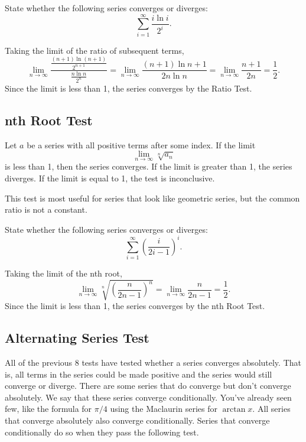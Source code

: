 \begin{example}
	State whether the following series converges or diverges:
	\begin{equation*}
		\sum_{i=1}^{\infty}{\frac{i\ln{i}}{2^i}}.
	\end{equation*}
\end{example}
Taking the limit of the ratio of subsequent terms,
\begin{equation*}
	\lim_{n\to\infty}{\frac{\frac{(n+1)\ln{(n+1)}}{2^{n+1}}}{\frac{n\ln{n}}{2^n}}} = \lim_{n\to\infty}{\frac{(n+1)\ln{n+1}}{2n\ln{n}}} = \lim_{n\to\infty}{\frac{n+1}{2n}} = \frac{1}{2}.
\end{equation*}
\indent
Since the limit is less than 1, the series converges by the Ratio Test.

\subsection{nth Root Test}
\begin{lemma}
	Let $a$ be a series with all positive terms after some index.
	If the limit
	\begin{equation*}
		\lim_{n\to\infty}{\sqrt[n]{a_n}}
	\end{equation*}
	is less than 1, then the series converges.
	If the limit is greater than 1, the series diverges.
	If the limit is equal to 1, the test is inconclusive.
\end{lemma}
\noindent
This test is most useful for series that look like geometric series, but the common ratio is not a constant.

\begin{example}
	State whether the following series converges or diverges:
	\begin{equation*}
		\sum_{i=1}^{\infty}{\left(\frac{i}{2i-1}\right)^i}.
	\end{equation*}
\end{example}
Taking the limit of the nth root,
\begin{equation*}
	\lim_{n\to\infty}{\sqrt[n]{\left(\frac{n}{2n-1}\right)^n}} = \lim_{n\to\infty}{\frac{n}{2n-1}} = \frac{1}{2}.
\end{equation*}
\indent
Since the limit is less than 1, the series converges by the nth Root Test.

\subsection{Alternating Series Test}
All of the previous 8 tests have tested whether a series converges absolutely.
That is, all terms in the series could be made positive and the series would still converge or diverge.
There are some series that do converge but don't converge absolutely.
We say that these series converge conditionally.
You've already seen  few, like the formula for $\pi/4$ using the Maclaurin series for $\arctan{x}$.
All series that converge absolutely also converge conditionally.
Series that converge conditionally do so when they pass the following test.

